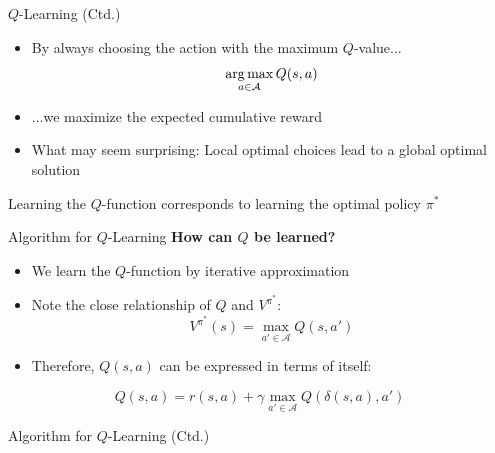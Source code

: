 \begin{frame}{$Q$-Learning (Ctd.)}{}
	\begin{itemize}
		\item By always choosing the action with the maximum $Q$-value...
		\begin{equation*}
			\operatorname*{arg\,max}_{a \in \mathcal{A}} Q(s, a)
		\end{equation*}
		\item ...we maximize the expected cumulative reward
		\item What may seem surprising: Local optimal choices lead to a global optimal solution
	\end{itemize}

	\vspace*{2mm}
	\begin{boxBlueNoFrame}
		Learning the $Q$-function corresponds to learning the optimal policy $\pi^*$
	\end{boxBlueNoFrame}
\end{frame}


\begin{frame}{Algorithm for $Q$-Learning}{}
	\textbf{How can $Q$ be learned?}
	\begin{itemize}
		\item We learn the $Q$-function by iterative approximation
		\item Note the close relationship of $Q$ and $V^{\pi^*}$:
		\begin{equation}
			V^{\pi^*}(s) = \max_{a' \in \mathcal{A}} Q(s, a')
		\end{equation}
		\item Therefore, $Q(s, a)$ can be expressed in terms of itself: 
	\end{itemize}
	
	\begin{boxBlueNoFrame}
		\begin{equation}
			Q(s, a) = r(s, a) + \gamma \max_{a' \in \mathcal{A}} Q(\delta(s, a), a')
		\end{equation}
	\end{boxBlueNoFrame}
\end{frame}


\begin{frame}{Algorithm for $Q$-Learning (Ctd.)}{}
\end{frame}


